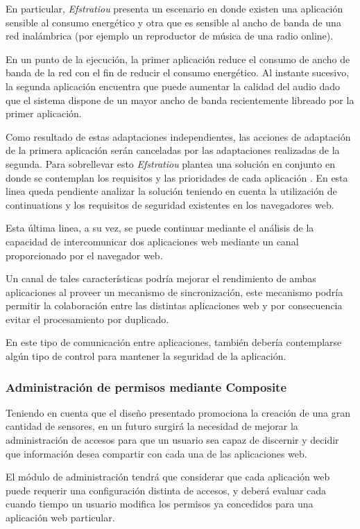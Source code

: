 En particular, \emph{Efstratiou} presenta un escenario en donde existen una aplicación sensible al consumo energético y otra que es sensible al ancho de banda de una red inalámbrica (por ejemplo un reproductor de música de una radio online).

En un punto de la ejecución, la primer aplicación reduce el consumo de ancho de banda de la red con el fin de reducir el consumo energético. Al instante sucesivo, la segunda aplicación encuentra que puede aumentar la calidad del audio dado que el sistema dispone de un mayor ancho de banda recientemente libreado por la primer aplicación.

Como resultado de estas adaptaciones independientes, las acciones de adaptación de la primera aplicación serán canceladas por las adaptaciones realizadas de la segunda. Para sobrellevar esto \emph{Efstratiou} plantea una solución en conjunto en donde se contemplan los requisitos y las prioridades de cada aplicación \cite[p.~58]{Efstratiou04}. En esta linea queda pendiente analizar la solución teniendo en cuenta la utilización de continuations y los requisitos de seguridad existentes en los navegadores web.

Esta última linea, a su vez, se puede continuar mediante el análisis de la capacidad de intercomunicar dos aplicaciones web mediante un canal proporcionado por el navegador web.

Un canal de tales características podría mejorar el rendimiento de ambas aplicaciones al proveer un mecanismo de sincronización, este mecanismo podría permitir la colaboración entre las distintas aplicaciones web y por consecuencia evitar el procesamiento por duplicado.

En este tipo de comunicación entre aplicaciones, también debería contemplarse algún tipo de control para mantener la seguridad de la aplicación.


\subsubsection{Administración de permisos mediante Composite}

Teniendo en cuenta que el diseño presentado promociona la creación de una gran cantidad de sensores, en un futuro surgirá la necesidad de mejorar la administración de accesos para que un usuario sea capaz de discernir y decidir que información desea compartir con cada una de las aplicaciones web.

El módulo de administración tendrá que considerar que cada aplicación web puede requerir una configuración distinta de accesos, y deberá evaluar cada cuando tiempo un usuario modifica los permisos ya concedidos para una aplicación web particular.


